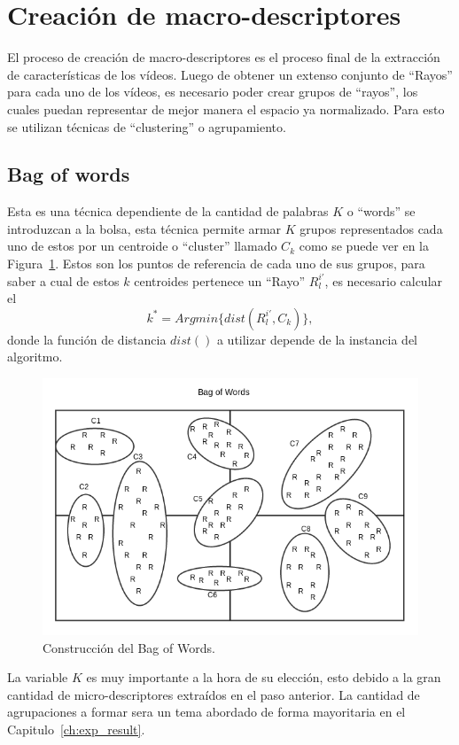 	
\newpage	
\section{Creación de macro-descriptores}
\label{sec:macro-descriptores}
El proceso de creación de macro-descriptores es el proceso final de la extracción de características de los vídeos. Luego de obtener un extenso conjunto de ``Rayos'' para cada uno de los vídeos, es necesario poder crear grupos de ``rayos'', los cuales puedan representar de mejor manera el espacio ya normalizado. Para esto se utilizan técnicas de ``clustering'' o agrupamiento.
	\subsection{Bag of words}
	\label{algoritmo:bow}
		Esta es una técnica dependiente de la cantidad de palabras $K$ o ``words'' se introduzcan a la bolsa, esta técnica permite armar $K$ grupos representados cada uno de estos por un centroide o ``cluster'' llamado $C_k$ como se puede ver en la Figura~\ref{algoritmo:fig:bow}. Estos son los puntos de referencia de cada uno de sus grupos, para saber a cual de estos $k$ centroides pertenece un ``Rayo'' $R^{i'}_l$, es necesario calcular el
		\begin{equation}
  			\label{algoritmo:eq:dist}
			k^* = Argmin\{dist(R^{i'}_l,C_k)\},
		\end{equation}
		donde la función de distancia $dist()$ a utilizar depende de la instancia del algoritmo.

	\begin{figure}[h]
		\centering
  		\label{algoritmo:fig:bow}
    		\includegraphics[width=1\textwidth]{Figuras/Diagramas/bow_solo.png}
  		\caption{Construcción del Bag of Words.}
	\end{figure}	
La variable $K$ es muy importante a la hora de su elección, esto debido a la gran cantidad de micro-descriptores extraídos en el paso anterior. La cantidad de agrupaciones a formar sera un tema abordado de forma mayoritaria en el Capitulo~\ref{ch:exp_result}.

